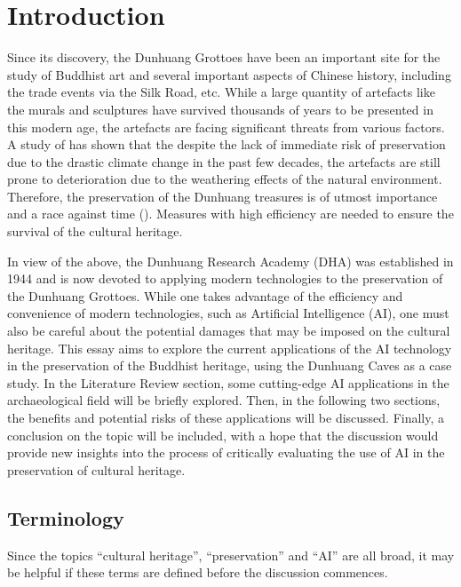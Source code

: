 \section{Introduction}

Since its discovery, the Dunhuang Grottoes have been an important site for the study of Buddhist art and
several important aspects of Chinese history, including the trade events via the Silk Road, etc.
While a large quantity of artefacts like the murals and sculptures have survived thousands of years
to be presented in this modern age, the artefacts are facing significant threats from various factors.
A study of  has shown that the despite the lack of immediate risk
of preservation due to the drastic climate change in the past few decades, the artefacts are still
prone to deterioration due to the weathering effects of the natural environment. Therefore, the
preservation of the Dunhuang treasures is of utmost importance and a race against time
(). Measures with high efficiency are needed to ensure the survival
of the cultural heritage.

In view of the above, the Dunhuang Research Academy (DHA) was established in 1944 and is now devoted to
applying modern technologies to the preservation of the Dunhuang Grottoes. While one takes advantage of
the efficiency and convenience of modern technologies, such as Artificial Intelligence (AI), one must
also be careful about the potential damages that may be imposed on the cultural heritage.
This essay aims to explore the current applications of the AI technology in the preservation of the 
Buddhist heritage, using the Dunhuang Caves as a case study. In the Literature Review section, some
cutting-edge AI applications in the archaeological field will be briefly explored. Then, in the
following two sections, the benefits and potential risks of these applications will be discussed.
Finally, a conclusion on the topic will be included, with a hope that the discussion would provide new
insights into the process of critically evaluating the use of AI in the preservation of cultural heritage.

\subsection{Terminology}

Since the topics ``cultural heritage'', ``preservation'' and ``AI'' are all broad, it may be helpful if
these terms are defined before the discussion commences. 


